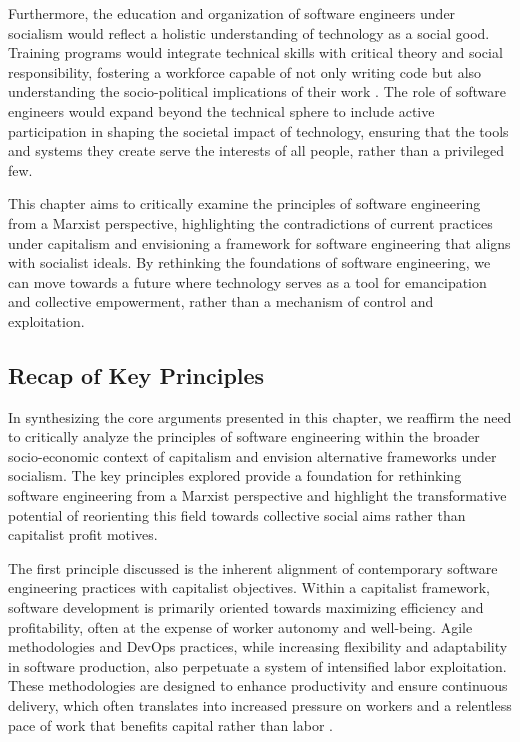 \begin{refsection}
Furthermore, the education and organization of software engineers under socialism would reflect a holistic understanding of technology as a social good. Training programs would integrate technical skills with critical theory and social responsibility, fostering a workforce capable of not only writing code but also understanding the socio-political implications of their work \cite[pp.~140-145]{leninState2017}. The role of software engineers would expand beyond the technical sphere to include active participation in shaping the societal impact of technology, ensuring that the tools and systems they create serve the interests of all people, rather than a privileged few.

This chapter aims to critically examine the principles of software engineering from a Marxist perspective, highlighting the contradictions of current practices under capitalism and envisioning a framework for software engineering that aligns with socialist ideals. By rethinking the foundations of software engineering, we can move towards a future where technology serves as a tool for emancipation and collective empowerment, rather than a mechanism of control and exploitation.

\subsection{Recap of Key Principles}

In synthesizing the core arguments presented in this chapter, we reaffirm the need to critically analyze the principles of software engineering within the broader socio-economic context of capitalism and envision alternative frameworks under socialism. The key principles explored provide a foundation for rethinking software engineering from a Marxist perspective and highlight the transformative potential of reorienting this field towards collective social aims rather than capitalist profit motives.

The first principle discussed is the inherent alignment of contemporary software engineering practices with capitalist objectives. Within a capitalist framework, software development is primarily oriented towards maximizing efficiency and profitability, often at the expense of worker autonomy and well-being. Agile methodologies and DevOps practices, while increasing flexibility and adaptability in software production, also perpetuate a system of intensified labor exploitation. These methodologies are designed to enhance productivity and ensure continuous delivery, which often translates into increased pressure on workers and a relentless pace of work that benefits capital rather than labor \cite[pp.~62-65]{bravermanLaborProcess1974}.


\end{refsection}
